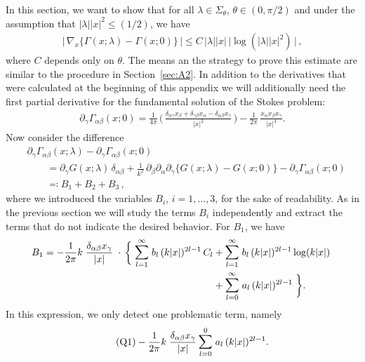 In this section, we want to show that for all $\lambda \in \Sigma_\theta$, $\theta \in (0,\pi/2)$ and under the assumption that $|\lambda| |x|^2 \leq (1/2)$, we have
\begin{align*}
  \Big|\, \nabla_x \big\{ \Gamma(x; \lambda) - \Gamma(x; 0) \big\} \, \Big| \leq C\, |\lambda| |x| \, \big|\log(|\lambda| |x|^2)\,\big|\,,
\end{align*}
where $C$ depends only on $\theta$.
The means an the strategy to prove this estimate are similar to the procedure in Section~\ref{sec:A2}.
In addition to the derivatives that were calculated at the beginning of this appendix we will additionally need  the first partial derivative for the fundamental solution of the Stokes problem:
\begin{align*}
  \partial_\gamma \Gamma_{\alpha\beta} (x; 0) 
  = \frac{1}{4 \pi}\, \bigg(\, \frac{\delta_{\alpha\gamma} x_\beta + \delta_{\gamma\beta} x_\alpha  - \delta_{\alpha\beta} x_\gamma}{|x|^2}  \, \bigg) 
  - \frac{1}{2\pi}\, \frac{x_\alpha x_\beta x_\gamma}{|x|^4} .
\end{align*}
Now consider the difference
\begin{align*}
  &\partial_\gamma \Gamma_{\alpha\beta}(x; \lambda) - \partial_\gamma \Gamma_{\alpha\beta}(x; 0) \\
  &\qquad=\partial_\gamma G(x; \lambda) \,\delta_{\alpha\beta}
  + \frac{1}{k^2} \, \partial_\beta \partial_\alpha \partial_\gamma \Big\{ G(x; \lambda) - G(x; 0) \Big\} 
  - \partial_\gamma \Gamma_{\alpha\beta}(x; 0) \\
  &\qquad\eqqcolon B_1 + B_2 + B_3 \,,
\end{align*}
where we introduced the variables $B_i$, $i = 1,\dots,3$, for the sake of readability.
As in the previous section we will study the terms $B_i$ independently and extract the terms that do not indicate the desired behavior.
For $B_1$, we have
\begin{align*}
  B_1 = -\frac{1}{2\pi} k\;  \frac{\delta_{\alpha\beta} x_\gamma}{|x|}  \;
  \cdot \,\bigg\{ \;
  \mathlarger{\sum}_{l = 1}^\infty \; b_l \, (k|x|)^{2l - 1} \, C_l 
  &+ \mathlarger{\sum}_{l = 1}^\infty \; b_l \, (k|x|)^{2l - 1} \log(k|x|) \; \\
  &+  \mathlarger{\sum}_{l = 0}^\infty \; a_l \, (k|x|)^{2l - 1} \; \bigg\}.
\end{align*}
In this expression, we only detect one problematic term, namely
\begin{align}
  \label{eq:Q1}
  \tag{Q1}
  -\frac{1}{2\pi} k\;  \frac{\delta_{\alpha\beta} x_\gamma}{|x|}\, \mathlarger{\sum}_{l = 0}^0 \; a_l \, (k|x|)^{2l - 1} .
\end{align}
